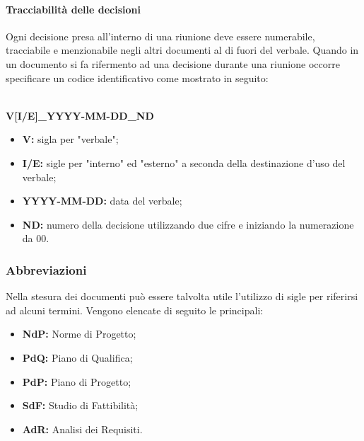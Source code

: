     \paragraph{Tracciabilità delle decisioni}
      Ogni decisione presa all'interno di una riunione deve essere numerabile, tracciabile e menzionabile negli altri documenti al di fuori del verbale. Quando in un documento si fa rifermento ad una decisione durante una riunione
      occorre specificare un codice identificativo come mostrato in seguito:\\\\
      \centerline{\textbf{V[I/E]\_YYYY-MM-DD\_ND}} 
      \begin{itemize}
      	\item \textbf{V:} sigla per "verbale";
      	\item \textbf{I/E:} sigle per "interno" ed "esterno" a seconda della destinazione d'uso del verbale;
      	\item \textbf{YYYY-MM-DD:} data del verbale;
      	\item \textbf{ND:} numero della decisione utilizzando due cifre e iniziando la numerazione da 00.
      \end{itemize}
  
  \subsubsection{Abbreviazioni}
  Nella stesura dei documenti può essere talvolta utile l'utilizzo di sigle per riferirsi ad alcuni termini. Vengono elencate di seguito le principali:
  \begin{itemize}
  	\item \textbf{NdP:} Norme di Progetto;
  	\item \textbf{PdQ:} Piano di Qualifica;
  	\item \textbf{PdP:} Piano di Progetto;
  	\item \textbf{SdF:} Studio di Fattibilità;
  	\item \textbf{AdR:} Analisi dei Requisiti.
  \end{itemize}
